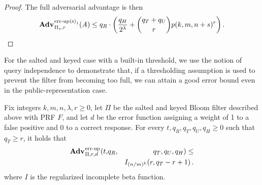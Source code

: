 \begin{proof}
The full adversarial advantage is then
$$\Adv{\erreps_1}_{\struct_s,r}(\advA) \le q_R \cdot \left(\frac{q_H}{2^\lambda} + \binom{q_T+q_U}{r}p(k, m, n+s)^r\right).$$
\missingqed
\end{proof}




For the salted and keyed case with a built-in threshold, we use the notion of query independence to demonstrate that, if a thresholding assumption is used to prevent the filter from becoming too full, we can attain a good error bound even in the public-representation case.

\begin{theorem}\label{thm:bf-key-bound}
Fix integers $k, m, n, \lambda, r\geq 0$, let $\Pi$ be the salted and keyed Bloom filter described above with PRF $F$, and let $d$ be the error function assigning a weight of 1 to a false positive and 0 to a correct response.
  For every $t, q_R, q_T, q_U, q_H \geq 0$ such that $q_T \geq r$, it holds that
  \begin{eqnarray*}
    \Adv{\errep}_{\struct,r,d}(t,&q_R,& q_T, q_U, q_H) \leq \\ && I_{(n/m)^k}(r, q_T-r+1) \,.
  \end{eqnarray*}
where $I$ is the regularized incomplete beta function.
\end{theorem}

